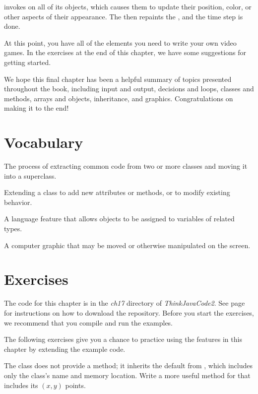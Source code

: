  invokes  on all of its  objects, which causes them to update their position, color, or other aspects of their appearance.
The  then repaints the , and the time step is done.

At this point, you have all of the elements you need to write your own video games.
In the exercises at the end of this chapter, we have some suggestions for getting started.

We hope this final chapter has been a helpful summary of topics presented throughout the book, including input and output, decisions and loops, classes and methods, arrays and objects, inheritance, and graphics.
Congratulations on making it to the end!


\section{Vocabulary}

\begin{description}

The process of extracting common code from two or more classes and moving it into a superclass.

Extending a class to add new attributes or methods, or to modify existing behavior.

A language feature that allows objects to be assigned to variables of related types.

A computer graphic that may be moved or otherwise manipulated on the screen.

\end{description}


\section{Exercises}

The code for this chapter is in the {\it ch17} directory of {\it ThinkJavaCode2}.
See page~\pageref{code} for instructions on how to download the repository.
Before you start the exercises, we recommend that you compile and run the examples.

The following exercises give you a chance to practice using the features in this chapter by extending the example code.


\begin{exercise}

The  class does not provide a  method; it inherits the default  from , which includes only the class's name and memory location.
Write a more useful  method for  that includes its $(x, y)$ points.

\end{exercise}


